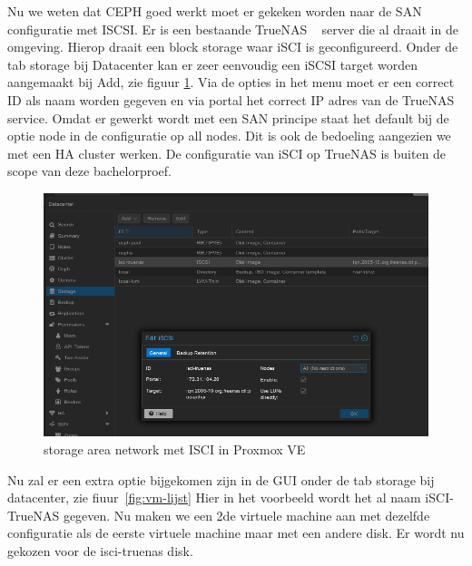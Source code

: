 Nu we weten dat CEPH goed werkt moet er gekeken worden naar de SAN configuratie met ISCSI.
Er is een bestaande TrueNAS ~\autocite{truenas} server die al draait in de omgeving. Hierop draait een block storage waar iSCI is geconfigureerd.
Onder de tab storage bij Datacenter kan er zeer eenvoudig een iSCSI target worden aangemaakt bij Add, zie figuur \ref{fig:iscsi-SAN}.
Via de opties in het menu moet er een correct ID als naam worden gegeven en via portal het correct IP adres van de TrueNAS service.
Omdat er gewerkt wordt met een SAN principe staat het default bij de optie node in de configuratie op all nodes. Dit is ook de bedoeling aangezien we met een HA cluster werken.
De configuratie van iSCI op TrueNAS is buiten de scope van deze bachelorproef.
\begin{figure}[H]
  \centering
  \includegraphics[width=1.1\textwidth]{../poc/iscsi-prox.png}
  \caption{storage area network met ISCI in Proxmox VE}
  \label{fig:iscsi-SAN}
\end{figure}
Nu zal er een extra  optie bijgekomen zijn in de GUI onder de tab storage bij datacenter, zie fiuur~\ref{fig:vm-lijst}  Hier in het voorbeeld wordt het al naam iSCI-TrueNAS gegeven.
Nu maken we een 2de virtuele machine aan met dezelfde configuratie als de eerste virtuele machine maar met een andere disk. Er wordt nu gekozen voor de isci-truenas disk.
